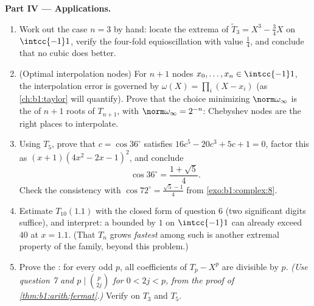 \begin{problem}
\medskip
\noindent\textbf{Part IV --- Applications.}
\begin{enumerate}[resume]
  \item Work out the case $n = 3$ by hand: locate the extrema of
        $\widetilde T_3 = X^3 - \frac34X$ on $\intcc{-1}1$,
        verify the four-fold equioscillation with value
        $\frac14$, and conclude that no  cubic does better.
  \item (Optimal interpolation nodes) For $n + 1$ nodes $x_0,
        \dots, x_n \in \intcc{-1}1$, the interpolation error is
        governed by $\omega(X) = \prod_i (X - x_i)$ (as
        \cref{ch:b1:taylor} will quantify). Prove that the choice
        minimizing $\norm\omega_\infty$ is the  of $n + 1$
        roots of $T_{n+1}$, with $\norm\omega_\infty = 2^{-n}$:
        Chebyshev nodes are the right places to interpolate.
  \item Using $T_5$, prove that $c = \cos 36^\circ$ satisfies
        $16c^5 - 20c^3 + 5c + 1 = 0$, factor this  as
        $(x + 1)(4x^2 - 2x - 1)^2$, and conclude
        \[
        \cos 36^\circ = \frac{1 + \sqrt5}4 .
        \]
        Check the consistency with $\cos 72^\circ =
        \frac{\sqrt5 - 1}4$ from \cref{exo:b1:complex:8}.
  \item Estimate $T_{10}(1.1)$ with the closed form of question 6
        (two significant digits suffice), and interpret: a
         bounded by $1$ on $\intcc{-1}1$ can already
        exceed $40$ at $x = 1.1$. (That $T_n$ grows
        \emph{fastest} among such  is another
        extremal property of the family, beyond this problem.)
  \item Prove the : for every odd  $p$, all
        coefficients of $T_p - X^p$ are divisible by $p$.
        \emph{(Use question 7 and $p \mid \binom p{2j}$ for $0 <
        2j < p$, from the proof of
        \cref{thm:b1:arith:fermat}.)} Verify on $T_3$ and $T_5$.
\end{enumerate}


\end{problem}
